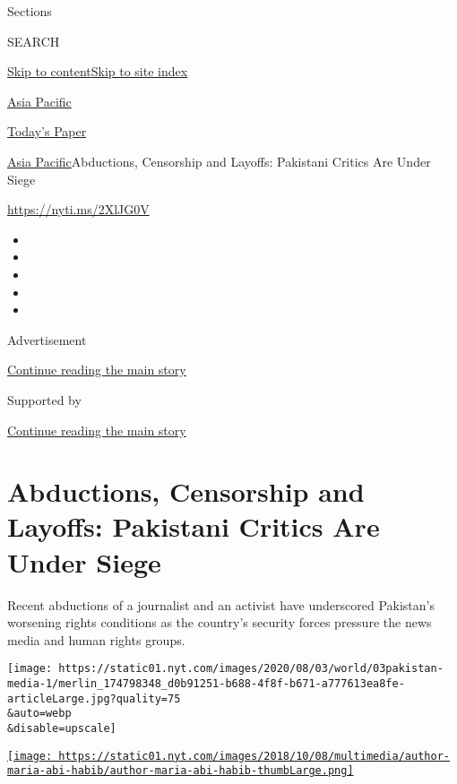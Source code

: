 Sections

SEARCH

\protect\hyperlink{site-content}{Skip to
content}\protect\hyperlink{site-index}{Skip to site index}

\href{https://www.nytimes.com/section/world/asia}{Asia Pacific}

\href{https://myaccount.nytimes.com/auth/login?response_type=cookie\&client_id=vi}{}

\href{https://www.nytimes.com/section/todayspaper}{Today's Paper}

\href{/section/world/asia}{Asia Pacific}\textbar{}Abductions, Censorship
and Layoffs: Pakistani Critics Are Under Siege

\url{https://nyti.ms/2XlJG0V}

\begin{itemize}
\item
\item
\item
\item
\item
\end{itemize}

Advertisement

\protect\hyperlink{after-top}{Continue reading the main story}

Supported by

\protect\hyperlink{after-sponsor}{Continue reading the main story}

\hypertarget{abductions-censorship-and-layoffs-pakistani-critics-are-under-siege}{%
\section{Abductions, Censorship and Layoffs: Pakistani Critics Are Under
Siege}\label{abductions-censorship-and-layoffs-pakistani-critics-are-under-siege}}

Recent abductions of a journalist and an activist have underscored
Pakistan's worsening rights conditions as the country's security forces
pressure the news media and human rights groups.

\texttt{[image: https://static01.nyt.com/images/2020/08/03/world/03pakistan-media-1/merlin\_174798348\_d0b91251-b688-4f8f-b671-a777613ea8fe-articleLarge.jpg?quality=75\\\&auto=webp\\\&disable=upscale]}

\href{https://www.nytimes.com/by/maria-abi-habib}{\texttt{[image: https://static01.nyt.com/images/2018/10/08/multimedia/author-maria-abi-habib/author-maria-abi-habib-thumbLarge.png]}}

